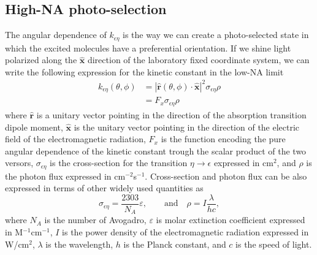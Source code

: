\documentclass{article}
\begin{document}
\subsection{High-NA photo-selection}
The angular dependence of $k_{\epsilon\eta}$ is the way we can create a photo-selected state in which the excited molecules have a preferential orientation. If we shine light polarized along the $\hat{\mathbf{x}}$ direction of the laboratory fixed coordinate system, we can write the following expression for the kinetic constant in the low-NA limit \cite{Fisz2005}
\begin{equation}\label{eq:k_low_na}
\begin{aligned}
    k_{\epsilon\eta}(\theta,\phi)
    &= 
    | \hat{\mathbf{r}}(\theta,\phi) \cdot \hat{\mathbf{x}} |^2
    \sigma_{\epsilon\eta} \rho \\
    &=
    F_x \sigma_{\epsilon\eta} \rho
\end{aligned}
\end{equation}
where $\hat{\mathbf{r}}$ is a unitary vector pointing in the direction of the absorption transition dipole moment, $\hat{\mathbf{x}}$ is the unitary vector pointing in the direction of the electric field of the electromagnetic radiation, $F_x$ is the function encoding the pure angular dependence of the kinetic constant trough the scalar product of the two versors, $\sigma_{\epsilon\eta}$ is the cross-section for the transition $\eta\rightarrow\epsilon$ expressed in cm$^2$, and $\rho$ is the photon flux expressed in cm$^{-2}$s$^{-1}$. Cross-section and photon flux can be also expressed in terms of other widely used quantities as \cite{TkachenkoBook}
\begin{equation}
    \sigma_{\epsilon\eta} = \frac{2303}{N_A} \varepsilon,
    \qquad \text{and} \quad
    \rho = I \frac{\lambda}{h c},
\end{equation}
where $N_A$ is the number of Avogadro, $\varepsilon$ is molar extinction coefficient expressed in M$^{-1}$cm$^{-1}$, $I$ is the power density of the electromagnetic radiation expressed in W/cm$^{2}$, $\lambda$ is the wavelength, $h$ is the Planck constant, and $c$ is the speed of light.
\end{document}

